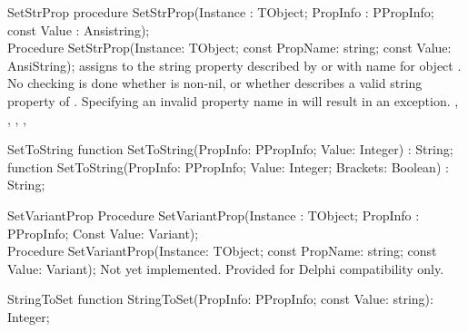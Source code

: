 \begin{procedure}{SetStrProp}
\Declaration
procedure SetStrProp(Instance : TObject; PropInfo : PPropInfo; 
                     const Value : Ansistring);\\
Procedure SetStrProp(Instance: TObject; const PropName: string; 
                     const Value: AnsiString);
\Description
{} assigns  to the string property described by
 or with name  for object . 
\Errors
No checking is done whether  is non-nil, or whether
 describes a valid string property of .
Specifying an invalid property name in  will result in an
 exception.
\SeeAlso
{}, , ,
,
\end{procedure}

\begin{function}{SetToString}
\Declaration
function SetToString(PropInfo: PPropInfo; 
                     Value: Integer) : String;\\
function SetToString(PropInfo: PPropInfo; 
                     Value: Integer; Brackets: Boolean) : String;
\Description
\Errors
\SeeAlso
\end{function}

\begin{procedure}{SetVariantProp}
\Declaration
Procedure SetVariantProp(Instance : TObject;
                         PropInfo : PPropInfo;
                         Const Value: Variant);\\
Procedure SetVariantProp(Instance: TObject; 
                         const PropName: string; 
                         const Value: Variant);                 
\Description
Not yet implemented. Provided for Delphi compatibility only.
\Errors
\SeeAlso
\end{procedure}


\begin{function}{StringToSet}
\Declaration
function StringToSet(PropInfo: PPropInfo; const Value: string): Integer;
\Description
\Errors
\SeeAlso
\end{function}
